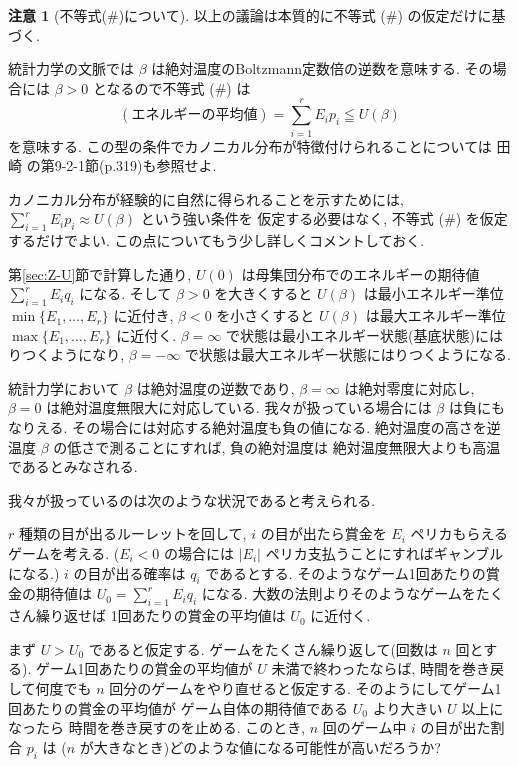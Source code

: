 \documentclass[12pt,twoside]{jarticle}
\theoremstyle{definition} %
\theoremstyle{definition} %
\theoremstyle{definition} %
\newtheorem{remark}[theorem]{注意}
\numberwithin{theorem}{section}
\numberwithin{equation}{section}
\numberwithin{figure}{section}
\numberwithin{table}{section}
\newcommand\secref[1]{第\ref{#1}節}
\begin{document}
\begin{remark}[不等式($\#$)について]
\label{remark:beta}
以上の議論は本質的に不等式 ($\#$) の仮定だけに基づく.

統計力学の文脈では $\beta$ は絶対温度のBoltzmann定数倍の逆数を意味する.
その場合には $\beta>0$ となるので不等式 ($\#$) は
\[
(\text{エネルギーの平均値})=\sum_{i=1}^r E_i p_i\leqq U(\beta)
\]
を意味する. 
この型の条件でカノニカル分布が特徴付けられることについては
田崎 \cite{Tasaki}の第9-2-1節(p.319)も参照せよ.

カノニカル分布が経験的に自然に得られることを示すためには, 
$\sum_{i=1}^r E_i p_i\approx U(\beta)$ という強い条件を
仮定する必要はなく, 不等式 ($\#$) を仮定するだけでよい.
この点についてもう少し詳しくコメントしておく.

\secref{sec:Z-U}で計算した通り,
$U(0)$ は母集団分布でのエネルギーの期待値 $\sum_{i=1}^r E_i q_i$ になる.
そして $\beta>0$ を大きくすると 
$U(\beta)$ は最小エネルギー準位 $\min\{E_1,\ldots,E_r\}$ に近付き, 
$\beta<0$ を小さくすると 
$U(\beta)$ は最大エネルギー準位 $\max\{E_1,\ldots,E_r\}$ に近付く.
$\beta=\infty$ で状態は最小エネルギー状態(基底状態)にはりつくようになり,
$\beta=-\infty$ で状態は最大エネルギー状態にはりつくようになる.

統計力学において $\beta$ は絶対温度の逆数であり, 
$\beta=\infty$ は絶対零度に対応し, 
$\beta=0$ は絶対温度無限大に対応している.
我々が扱っている場合には $\beta$ は負にもなりえる.
その場合には対応する絶対温度も負の値になる.
絶対温度の高さを逆温度 $\beta$ の低さで測ることにすれば, 負の絶対温度は
絶対温度無限大よりも高温であるとみなされる.

我々が扱っているのは次のような状況であると考えられる.

$r$ 種類の目が出るルーレットを回して, 
$i$ の目が出たら賞金を $E_i$ ペリカもらえるゲームを考える.
($E_i<0$ の場合には $|E_i|$ ペリカ支払うことにすればギャンブルになる.)
$i$ の目が出る確率は $q_i$ であるとする.
そのようなゲーム1回あたりの賞金の期待値は $U_0=\sum_{i=1}^r E_i q_i$ になる.
大数の法則よりそのようなゲームをたくさん繰り返せば
1回あたりの賞金の平均値は $U_0$ に近付く.

まず $U>U_0$ であると仮定する.
ゲームをたくさん繰り返して(回数は $n$ 回とする). 
ゲーム1回あたりの賞金の平均値が $U$ 未満で終わったならば, 
時間を巻き戻して何度でも $n$ 回分のゲームをやり直せると仮定する.
そのようにしてゲーム1回あたりの賞金の平均値が
ゲーム自体の期待値である $U_0$ より大きい $U$ 以上になったら
時間を巻き戻すのを止める.
このとき, $n$ 回のゲーム中 $i$ の目が出た割合 $p_i$ は
($n$ が大きなとき)どのような値になる可能性が高いだろうか?


\end{remark}
\end{document}
